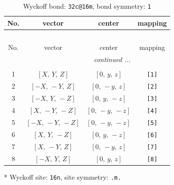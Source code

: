 \documentclass[fleqn,8pt]{jsarticle}
\begin{document}
\renewcommand{\arraystretch}{1.2}
\begin{longtable}{cccc}
\caption{Wyckoff bond: {\tt 32c@16m}, bond symmetry: {\tt 1}}
 \\
 \hline \hline
No. & vector & center & mapping \\ \hline \endfirsthead

\multicolumn{3}{l}{\tablename\ \thetable{}} \\
 \hline \hline
No. & vector & center & mapping \\ \hline \endhead

 \hline \hline
\multicolumn{3}{r}{\footnotesize\it continued ...} \\ \endfoot

 \hline \hline
\multicolumn{3}{r}{} \\ \endlastfoot

1 & $\left[ X,\, Y,\, Z \right]$ & $\left[ 0,\, y,\, z \right]$ & {\tt [1]} \\ \hline
2 & $\left[ - X,\, - Y,\, Z \right]$ & $\left[ 0,\, - y,\, z \right]$ & {\tt [2]} \\ \hline
3 & $\left[ - X,\, Y,\, - Z \right]$ & $\left[ 0,\, y,\, - z \right]$ & {\tt [3]} \\ \hline
4 & $\left[ X,\, - Y,\, - Z \right]$ & $\left[ 0,\, - y,\, - z \right]$ & {\tt [4]} \\ \hline
5 & $\left[ - X,\, - Y,\, - Z \right]$ & $\left[ 0,\, - y,\, - z \right]$ & {\tt [5]} \\ \hline
6 & $\left[ X,\, Y,\, - Z \right]$ & $\left[ 0,\, y,\, - z \right]$ & {\tt [6]} \\ \hline
7 & $\left[ X,\, - Y,\, Z \right]$ & $\left[ 0,\, - y,\, z \right]$ & {\tt [7]} \\ \hline
8 & $\left[ - X,\, Y,\, Z \right]$ & $\left[ 0,\, y,\, z \right]$ & {\tt [8]} \\
\end{longtable}
* Wyckoff site: {\tt 16n}, site symmetry: {\tt .m.}
\renewcommand{\arraystretch}{1.2}
\end{document}
